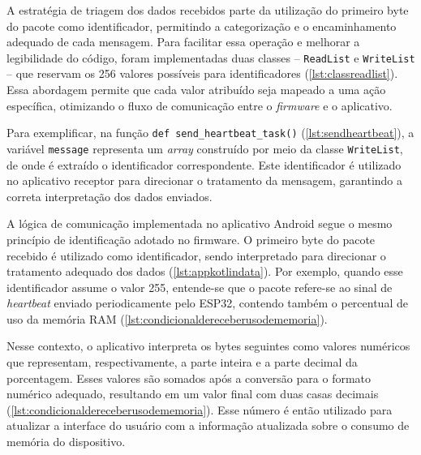 A estratégia de triagem dos dados recebidos parte da utilização do primeiro byte do pacote como identificador, permitindo a categorização e o encaminhamento adequado de cada mensagem. Para facilitar essa operação e melhorar a legibilidade do código, foram implementadas duas classes – \texttt{ReadList} e \texttt{WriteList} – que reservam os 256 valores possíveis para identificadores (\autoref{lst:classreadlist}). Essa abordagem permite que cada valor atribuído seja mapeado a uma ação específica, otimizando o fluxo de comunicação entre o \textit{firmware} e o aplicativo.

Para exemplificar, na função \texttt{def send\_heartbeat\_task()} (\autoref{lst:sendheartbeat}), a variável \texttt{message} representa um \textit{array} construído por meio da classe \texttt{WriteList}, de onde é extraído o identificador correspondente. Este identificador é utilizado no aplicativo receptor para direcionar o tratamento da mensagem, garantindo a correta interpretação dos dados enviados.


  
A lógica de comunicação implementada no aplicativo Android segue o mesmo princípio de identificação adotado no firmware. O primeiro byte do pacote recebido é utilizado como identificador, sendo interpretado para direcionar o tratamento adequado dos dados (\autoref{lst:appkotlindata}). Por exemplo, quando esse identificador assume o valor 255, entende-se que o pacote refere-se ao sinal de \textit{heartbeat} enviado periodicamente pelo ESP32, contendo também o percentual de uso da memória RAM (\autoref{lst:condicionaldereceberusodememoria}).





Nesse contexto, o aplicativo interpreta os bytes seguintes como valores numéricos que representam, respectivamente, a parte inteira e a parte decimal da porcentagem. Esses valores são somados após a conversão para o formato numérico adequado, resultando em um valor final com duas casas decimais (\autoref{lst:condicionaldereceberusodememoria}). Esse número é então utilizado para atualizar a interface do usuário com a informação atualizada sobre o consumo de memória do dispositivo.

